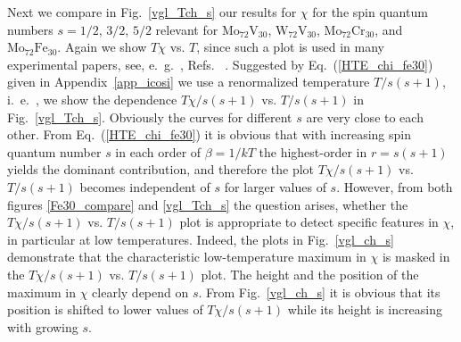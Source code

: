 \documentclass[aps,twocolumn,groupedaddress]{revtex4}
\newcommand {\mofe} {$\textrm{Mo}_{72}\textrm{Fe}_{30}$}
\newcommand {\mocr} {$\textrm{Mo}_{72}\textrm{Cr}_{30}$}
\newcommand {\mov} {$\textrm{Mo}_{72}\textrm{V}_{30}$}
\newcommand {\wv} {$\textrm{W}_{72}\textrm{V}_{30}$}
\begin{document}
Next we compare in Fig.~\ref{vgl_Tch_s} our results for $\chi$ for  the spin quantum
numbers $s=1/2$, $3/2$, $5/2$ relevant for \mov, \wv,  \mocr, and \mofe.  Again we show $T \chi$ vs. $T$, since
such a plot is used in many experimental papers, see, e.~g.~,
Refs.~ .
Suggested by Eq.~(\ref{HTE_chi_fe30}) given  in Appendix~\ref{app_icosi}
we use a renormalized temperature $T/s(s+1)$, i.~e.~, we show the dependence
 $T \chi/s(s+1)$ vs. $T/ s(s+1)$ in Fig.~\ref{vgl_Tch_s}.  Obviously the curves for
different
$s$ are very close to
each other. From Eq.~(\ref{HTE_chi_fe30}) it is obvious that with increasing
spin quantum number $s$  in each order of $\beta=1/kT$ the highest-order in
$r=s(s+1)$ yields the dominant contribution, and therefore the plot $T \chi/s(s+1)$
vs. $T/ s(s+1)$ becomes independent of $s$ for larger values of $s$.
However, from both figures \ref{Fe30_compare} and \ref{vgl_Tch_s} the
question arises, whether  the $T \chi/s(s+1)$
vs. $T/ s(s+1)$ plot is appropriate to detect specific features in $\chi$, in
particular at low temperatures. Indeed, the plots in Fig.~\ref{vgl_ch_s}
demonstrate that the characteristic low-temperature maximum in $\chi$ is masked in
the $T \chi/s(s+1)$ vs. $T/ s(s+1)$ plot. The height and the position of the
maximum in $\chi$  clearly depend on $s$. From Fig.~\ref{vgl_ch_s} it is obvious
that its position is shifted to lower values of $T \chi/s(s+1)$ while its
height is increasing with growing $s$.
\end{document}
